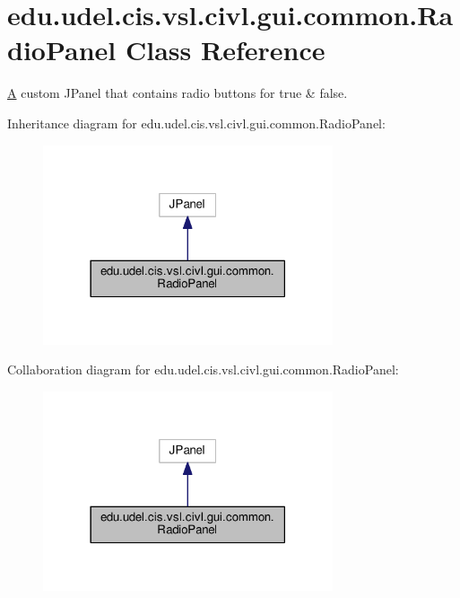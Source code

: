 \hypertarget{classedu_1_1udel_1_1cis_1_1vsl_1_1civl_1_1gui_1_1common_1_1RadioPanel}{}\section{edu.\+udel.\+cis.\+vsl.\+civl.\+gui.\+common.\+Radio\+Panel Class Reference}
\label{classedu_1_1udel_1_1cis_1_1vsl_1_1civl_1_1gui_1_1common_1_1RadioPanel}


\hyperlink{structA}{A} custom J\+Panel that contains radio buttons for true \& false.  




Inheritance diagram for edu.\+udel.\+cis.\+vsl.\+civl.\+gui.\+common.\+Radio\+Panel\+:
\nopagebreak
\begin{figure}[H]
\begin{center}
\leavevmode
\includegraphics[width=242pt]{classedu_1_1udel_1_1cis_1_1vsl_1_1civl_1_1gui_1_1common_1_1RadioPanel__inherit__graph}
\end{center}
\end{figure}


Collaboration diagram for edu.\+udel.\+cis.\+vsl.\+civl.\+gui.\+common.\+Radio\+Panel\+:
\nopagebreak
\begin{figure}[H]
\begin{center}
\leavevmode
\includegraphics[width=242pt]{classedu_1_1udel_1_1cis_1_1vsl_1_1civl_1_1gui_1_1common_1_1RadioPanel__coll__graph}
\end{center}
\end{figure}
